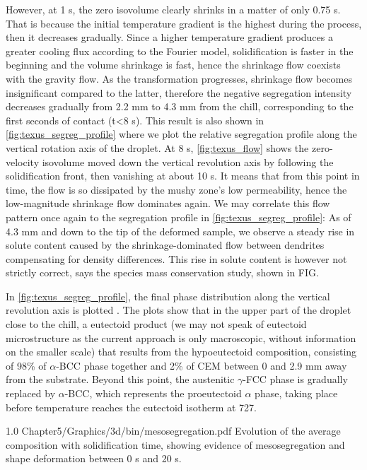 However, at 1 s, the zero isovolume clearly shrinks in a matter of only 0.75 s. That is
because the initial temperature gradient is the highest during the process, then it decreases gradually. 
Since a higher temperature gradient produces a greater cooling flux according to the Fourier model, solidification is faster
in the beginning and the volume shrinkage is fast, hence the shrinkage flow coexists with the gravity flow. As the transformation
progresses, shrinkage flow becomes insignificant compared to the latter, therefore the negative segregation intensity decreases gradually from 2.2 mm
to 4.3 mm from the chill, corresponding to the first seconds of contact (t<8 s).
This result is also shown in \cref{fig:texus_segreg_profile} where we plot the relative segregation profile along the vertical rotation axis of the droplet.
At 8 s, \cref{fig:texus_flow} shows the zero-velocity isovolume moved down the vertical revolution axis by following
the solidification front, then vanishing at about 10 s. It means that from this point in time, the flow is so dissipated by the mushy zone's low permeability,
hence the low-magnitude shrinkage flow dominates again.
We may correlate this flow pattern once again to the segregation profile in \cref{fig:texus_segreg_profile}:
As of 4.3 mm and down to the tip of the deformed sample, we observe a steady rise in solute content caused 
by the shrinkage-dominated flow between dendrites compensating for density differences. 
This rise in solute content is however not strictly correct, says the species mass conservation study, shown in FIG.

In \cref{fig:texus_segreg_profile}, the final phase distribution along the vertical revolution axis is plotted .
The plots show that in the upper part of the droplet close to the chill, a eutectoid product (we may not speak of eutectoid microstructure as the current approach is only macroscopic, without
information on the smaller scale) that results from the hypoeutectoid composition, consisting of 98\% of $\alpha$-BCC phase together and 2\% of CEM between 0 and 2.9 mm away from the substrate.
Beyond this point, the austenitic $\gamma$-FCC phase is gradually replaced by $\alpha$-BCC, which represents the proeutectoid $\alpha$ phase, taking place before temperature
reaches the eutectoid isotherm at \SI{727}{\udegC}.

\begin{figureth}
{1.0}
{Chapter5/Graphics/3d/bin/mesosegregation.pdf}
{Evolution of the average composition with solidification time, showing evidence of mesosegregation and shape deformation between 0 s and 20 s.}
\label{fig:texus_mesoseg}
\end{figureth}

